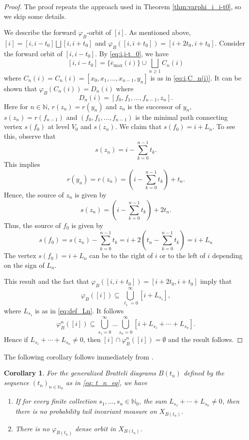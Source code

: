 \documentclass[11pt,reqno]{amsart}
\theoremstyle{definition}
\theoremstyle{remark}
\theoremstyle{plain}
\newtheorem{corol}[definition]{Corollary}
\def\ol{\overline}
\newcommand{\N}{\mathbb N}
\numberwithin{equation}{section}
\begin{document}
\begin{proof} The proof repeats the approach used in Theorem \ref{thm:varphi_i_i-t0}, so we skip some details. 

We describe the forward $\varphi_B$-orbit of $[i]$. As mentioned above, $[i] = [i,i-t_0] \bigsqcup [i,i+t_0]$ and $\varphi_{B}([i,i+t_0])  = [i+2t_0, i+t_0]$. Consider the forward orbit of $[i,i-t_0]$. By \eqref{eq:i,i-t_0}, we have
$$
[i,i-t_0] = \{\ol{e}_{\mathrm{max}} (i) \}\cup  \bigsqcup_{n\geq 1} C_n(i)
$$ 
where $C_n(i) = C_n(i) = [x_0,x_1,\ldots,x_{n-1},y_n]$ is as in \eqref{eq:i,C_n(i)}. It can be shown that $\varphi_{B}(C_n(i)) = 
D_n(i)$ where 
\[
D_n(i) = [f_0,f_1,\ldots,f_{n-1},z_n].
\] 
Here for $n\in \N$, $r(z_n) = r(y_n)$ and $z_n$ is the successor of $y_n$, $s(z_n) = r(f_{n-1})$ and $(f_0,f_1,\ldots,f_{n-1})$ is the minimal path connecting vertex $s(f_0)$ at level $V_0$ and $s(z_n)$. We claim that $s(f_0) = i+L_n$. To see this, observe that
\[
s(z_n) = i - \sum_{k=0}^{n-1} t_k.
\]
This implies
\[
r(y_n) =r(z_n) = \left(i - \sum_{k=0}^{n-1} t_k\right) + t_n.
\]
Hence, the source of $z_n$ is given by
\[
s(z_n) = \left(i - \sum_{k=0}^{n-1} t_k\right) + 2t_n.
\] 
Thus, the source of $f_0$ is given by
\[
s(f_0) = s(z_n) - \sum_{k=0}^{n-1} t_k = i+ 2\left(t_n - \sum_{k=0}^{n-1} t_k\right) = i + L_n
\] 
The vertex $s(f_0) = i+ L_n$ can be to the right of $i$ or to the left of $i$ depending on the sign of $L_n$. 

This result and the fact that $\varphi_{B}([i,i+t_0])  = [i+2t_0, i+t_0]$ imply that
\[
\varphi_B([i]) \subseteq \bigcup_{\ell_1=0}^{\infty} [i+L_{s_1}],
\] 
where $L_{s_1}$ is as in \eqref{eq:def_Ln}. It follows 
\[
\varphi_B^n([i]) \subseteq \bigcup_{s_1=0}^{\infty} \ldots \bigcup_{s_n=0}^{\infty}[i+L_{s_1}+\cdots+L_{s_n}].
\] 
Hence if $L_{s_1}+\cdots+L_{s_n} \neq 0$, then $[i] \cap \varphi_B^n([i]) = \emptyset$ and the result follows. 
\end{proof} 

The following corollary follows immediately from .

\begin{corol} \label{s8 cor2}
For the generalized Bratteli diagrams $B(t_n)$ defined by the sequence $(t_n)_{n\in\N_0}$ as in \eqref{eq: t_n_eq}, we have 

\begin{enumerate}
    \item If for every finite collection $s_1,\ldots,s_n \in \N_0$, the sum $L_{s_1}+\cdots+L_{s_n} \neq 0$, then there is no probability tail invariant measure on $X_{B(t_n)}$. 
    \item There is no $\varphi_{B(t_n)}$ dense orbit in $X_{B(t_n)}$. 
\end{enumerate}

\end{corol}
\end{document}
